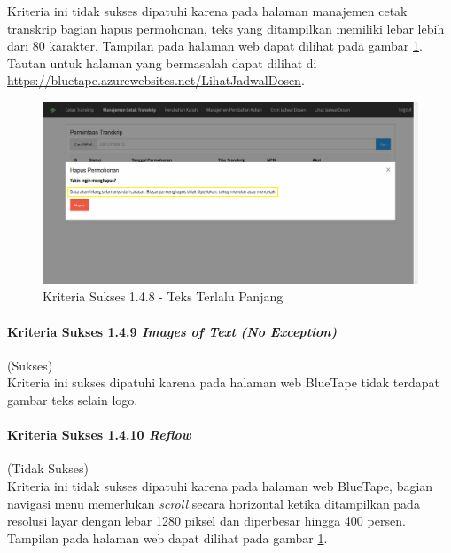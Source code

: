 \documentclass[a4paper,twoside]{article}
\begin{document}
\begin{enumerate}
		Kriteria ini tidak sukses dipatuhi karena pada halaman manajemen cetak transkrip bagian hapus permohonan, teks yang ditampilkan memiliki lebar lebih dari 80 karakter. Tampilan pada halaman web dapat dilihat pada gambar \ref{fig:1.4.8_visual_presentation}. Tautan untuk halaman yang bermasalah dapat dilihat di \url{https://bluetape.azurewebsites.net/LihatJadwalDosen}.

		\begin{figure}[H]
			\centering  
			\includegraphics[scale=0.3, frame]{kriteria-sukses-1-4-8-visual-presentation}  
			\caption[Kriteria Sukses 1.4.8 - Teks Terlalu Panjang]{Kriteria Sukses 1.4.8 - Teks Terlalu Panjang}
			\label{fig:1.4.8_visual_presentation}  
		\end{figure} 
		
		\paragraph{Kriteria Sukses 1.4.9 \textit{Images of Text (No Exception)}}
		\label{par:kepatuhan_bluetape_kriteria_sukses_1.4.9}
		(Sukses)\\

		Kriteria ini sukses dipatuhi karena pada halaman web BlueTape tidak terdapat gambar teks selain logo.

		\paragraph{Kriteria Sukses 1.4.10 \textit{Reflow}}
		\label{par:kepatuhan_bluetape_kriteria_sukses_1.4.10}
		(Tidak Sukses)\\

		Kriteria ini tidak sukses dipatuhi karena pada halaman web BlueTape, bagian navigasi menu memerlukan \textit{scroll} secara horizontal ketika ditampilkan pada resolusi layar dengan lebar 1280 piksel dan diperbesar hingga 400 persen. Tampilan pada halaman web dapat dilihat pada gambar \ref{fig:1.4.8_visual_presentation}.


\end{enumerate}
\end{document}
